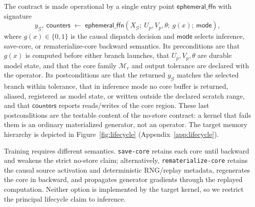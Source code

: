 The contract is made operational by a single entry point
$\mathsf{ephemeral\_ffn}$ with signature
\begin{equation}
y_{\mathcal G},\ \mathsf{counters}\;\leftarrow\;
\mathsf{ephemeral\_ffn}\!\left(X_{\mathcal G};\ U_p,V_p,\theta;\ g(x);\ \mathsf{mode}\right),
\label{eq:operator-api}
\end{equation}
where $g(x)\in\{0,1\}$ is the causal dispatch decision and $\mathsf{mode}$
selects inference, save-core, or rematerialize-core backward semantics. Its
preconditions are that $g(x)$ is computed before either branch launches, that
$U_p,V_p,\theta$ are durable model state, and that the core family
$\mathcal M_r$ and output tolerance are declared with the operator. Its
postconditions are that the returned $y_{\mathcal G}$ matches the selected
branch within tolerance, that in inference mode no core buffer is returned,
aliased, registered as model state, or written outside the declared scratch
range, and that $\mathsf{counters}$ reports reads/writes of the core region.
These last postconditions are the testable content of the no-store contract: a
kernel that fails them is an ordinary materialized generator, not an \mwg
operator. The target memory hierarchy is depicted in
Figure~\ref{fig:lifecycle} (Appendix~\ref{app:lifecycle}).

Training requires different semantics.  \texttt{save-core} retains each core
until backward and weakens the strict no-store claim; alternatively,
\texttt{rematerialize-core} retains the causal source activation and
deterministic RNG/replay metadata, regenerates the core in backward, and
propagates generator gradients through the replayed computation. Neither
option is implemented by the target kernel, so we restrict the principal
lifecycle claim to inference.